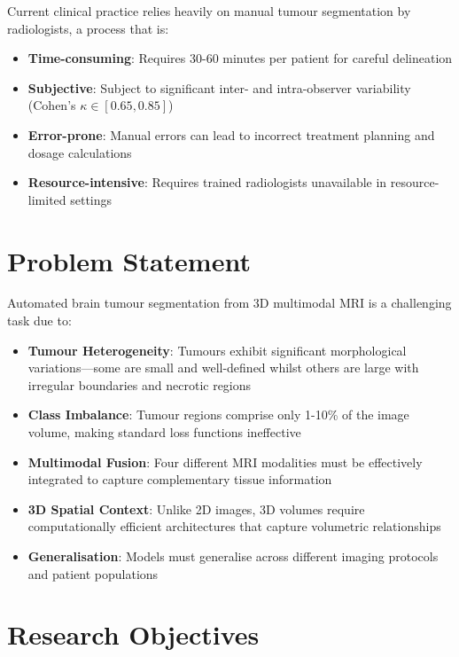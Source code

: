 \documentclass{ecsproject}     %
\begin{document}
Current clinical practice relies heavily on manual tumour segmentation by radiologists, a process that is:
\begin{itemize}
    \item \textbf{Time-consuming}: Requires 30-60 minutes per patient for careful delineation
    \item \textbf{Subjective}: Subject to significant inter- and intra-observer variability (Cohen's $\kappa \in [0.65, 0.85]$)
    \item \textbf{Error-prone}: Manual errors can lead to incorrect treatment planning and dosage calculations
    \item \textbf{Resource-intensive}: Requires trained radiologists unavailable in resource-limited settings
\end{itemize}

\section{Problem Statement}

Automated brain tumour segmentation from 3D multimodal MRI is a challenging task due to:

\begin{itemize}
    \item \textbf{Tumour Heterogeneity}: Tumours exhibit significant morphological variations—some are small and well-defined whilst others are large with irregular boundaries and necrotic regions
    \item \textbf{Class Imbalance}: Tumour regions comprise only 1-10\% of the image volume, making standard loss functions ineffective
    \item \textbf{Multimodal Fusion}: Four different MRI modalities must be effectively integrated to capture complementary tissue information
    \item \textbf{3D Spatial Context}: Unlike 2D images, 3D volumes require computationally efficient architectures that capture volumetric relationships
    \item \textbf{Generalisation}: Models must generalise across different imaging protocols and patient populations
\end{itemize}

\section{Research Objectives}
\end{document}
